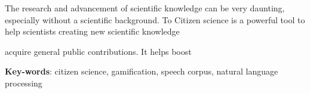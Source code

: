 
\setlength{\absparsep}{18pt}
\begin{resumo}
    The research and advancement of scientific knowledge can be very daunting, especially without a scientific background. To 
    Citizen science is a powerful tool to help scientists creating new scientific knowledge
    
    acquire general public contributions. It helps boost 
    
	\vspace{\onelineskip}
	\noindent 
	
	\textbf{Key-words}: citizen science, gamification, speech corpus, natural language processing
\end{resumo}
